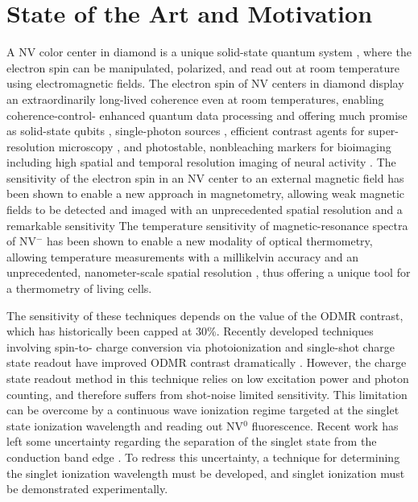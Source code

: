 \section{State of the Art and Motivation}
A NV color center in diamond is a unique solid-state quantum system \citep{Gaebel2006,Dutt2007,Aharonovich2011}, where the electron
spin can be manipulated, polarized, and read out at room temperature using electromagnetic
fields. The electron spin of NV centers in diamond display an extraordinarily long-lived
coherence even at room temperatures, \cite{Gaebel2006,Dutt2007,Aharonovich2011,Childress2006} enabling coherence-control- enhanced quantum data
processing \cite{Dutt2007,Aharonovich2011} and offering much promise as solid-state qubits \cite{Dutt2007,Aharonovich2011,Childress2006,Nizovtsev2005}, single-photon sources \cite{Beveratos2002}
, efficient contrast agents for super-resolution microscopy \cite{Gruber1997}, and photostable, nonbleaching
markers for bioimaging \cite{Gruber1997,McGuinness2011} including high spatial and temporal resolution imaging of neural
activity \cite{Hall2012}. The sensitivity of the electron spin in an NV center to an external magnetic field has
been shown to enable a new approach in magnetometry, allowing weak magnetic fields to be
detected and imaged with an unprecedented spatial resolution and a remarkable sensitivity \cite{LeSage2013,Taylor2008,Maze2008,Balasubramanian2008}
The temperature sensitivity of magnetic-resonance spectra of NV$^-$ \cite{Acosta2010}
has been shown to enable a new modality of optical thermometry, allowing temperature
measurements with a millikelvin accuracy and an unprecedented, nanometer-scale spatial
resolution \cite{Kucsko2013}, thus offering a unique tool for a thermometry of living cells.

The sensitivity of these techniques depends on the value of the ODMR contrast, which
has historically been capped at 30\%. Recently developed techniques involving spin-to- charge
conversion via photoionization and single-shot charge state readout have improved ODMR
contrast dramatically \cite{Shields2015}. However, the charge state readout method in this technique relies on
low excitation power and photon counting, and therefore suffers from shot-noise limited
sensitivity. This limitation can be overcome by a continuous wave ionization regime targeted at
the singlet state ionization wavelength and reading out NV$^0$ fluorescence. Recent work has left
some uncertainty regarding the separation of the singlet state from the conduction band edge \cite{Toyli2012,Goldman2015,Goldman2015a}. 
To redress this uncertainty, a technique for determining the singlet ionization wavelength
must be developed, and singlet ionization must be demonstrated experimentally.

